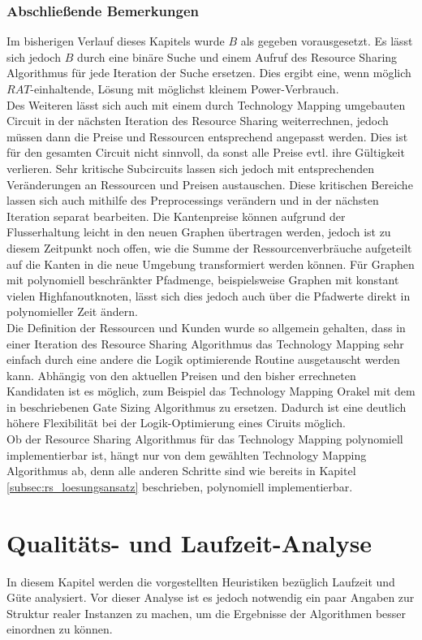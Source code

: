 \documentclass[11pt, a4paper, german]{article}
\newcommand{\TM}{Technology  Mapping }
\begin{document}
\subsubsection{Abschließende Bemerkungen}
Im bisherigen Verlauf dieses Kapitels wurde $B$ als gegeben vorausgesetzt. Es lässt sich jedoch $B$ durch eine binäre Suche und einem Aufruf des Resource Sharing Algorithmus für jede Iteration der Suche ersetzen. Dies ergibt eine, wenn möglich $RAT$-einhaltende, Lösung mit möglichst kleinem Power-Verbrauch. \\
Des Weiteren lässt sich auch mit einem durch \TM umgebauten Circuit in der nächsten Iteration des Resource Sharing weiterrechnen, jedoch müssen dann die Preise und Ressourcen entsprechend angepasst werden. Dies ist für den gesamten Circuit nicht sinnvoll, da sonst alle Preise evtl. ihre Gültigkeit verlieren. Sehr kritische Subcircuits lassen sich jedoch  mit entsprechenden Veränderungen an Ressourcen und Preisen austauschen. Diese kritischen Bereiche lassen sich auch mithilfe des Preprocessings verändern und in der nächsten Iteration separat bearbeiten. Die Kantenpreise können aufgrund der Flusserhaltung leicht in den neuen Graphen übertragen werden, jedoch ist zu diesem Zeitpunkt noch offen, wie die Summe der Ressourcenverbräuche aufgeteilt auf die Kanten in die neue Umgebung transformiert werden können. Für Graphen mit polynomiell beschränkter Pfadmenge, beispielsweise Graphen mit konstant vielen Highfanoutknoten, lässt sich dies jedoch auch über die Pfadwerte direkt in polynomieller Zeit ändern. \\
Die Definition der Ressourcen und Kunden wurde so allgemein gehalten, dass in einer Iteration des Resource Sharing Algorithmus das \TM sehr einfach durch eine andere die Logik optimierende Routine ausgetauscht werden kann. Abhängig von den aktuellen Preisen und den bisher errechneten Kandidaten ist es möglich, zum Beispiel das \TM Orakel mit  dem  in \cite{Daboul2018} beschriebenen  Gate Sizing Algorithmus zu ersetzen.  Dadurch ist eine deutlich höhere Flexibilität bei der Logik-Optimierung eines Ciruits möglich. \\
Ob der Resource Sharing Algorithmus für das \TM polynomiell implementierbar ist, hängt nur von dem gewählten \TM Algorithmus ab, denn alle anderen Schritte sind wie bereits in Kapitel \ref{subsec:rs_loesungsansatz} beschrieben, polynomiell implementierbar. 

\section{Qualitäts- und Laufzeit-Analyse}
\label{sec:analyse}
In diesem Kapitel werden die vorgestellten Heuristiken bezüglich Laufzeit und Güte analysiert. Vor dieser Analyse ist es jedoch notwendig ein paar Angaben zur Struktur realer Instanzen zu machen, um die Ergebnisse der Algorithmen besser einordnen zu können.\\
\end{document}
